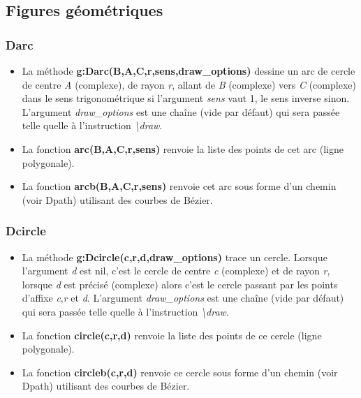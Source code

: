 \documentclass[%
10pt,%
a4paper,%
french,%
]%
{article}%
\begin{document}
\subsection{Figures géométriques}

\subsubsection{Darc}
\begin{itemize}
    \item La méthode \textbf{g:Darc(B,A,C,r,sens,draw\_options)} dessine un arc de cercle de centre \emph{A} (complexe), de rayon \emph{r}, allant de \emph{B} (complexe) vers \emph{C} (complexe) dans le sens trigonométrique si l'argument \emph{sens} vaut 1, le sens inverse sinon. L'argument \emph{draw\_options} est une chaîne (vide par défaut) qui sera passée telle quelle à l'instruction \emph{\textbackslash draw}.
    \item La fonction \textbf{arc(B,A,C,r,sens)} renvoie la liste des points de cet arc (ligne polygonale). 
    \item La fonction \textbf{arcb(B,A,C,r,sens)} renvoie cet arc sous forme d'un chemin (voir Dpath) utilisant des courbes de Bézier.
\end{itemize}

\subsubsection{Dcircle}
\begin{itemize}
    \item La méthode \textbf{g:Dcircle(c,r,d,draw\_options)} trace un cercle. Lorsque l'argument \emph{d} est nil, c'est le cercle de centre \emph{c} (complexe) et de rayon \emph{r}, lorsque \emph{d} est précisé (complexe) alors c'est le cercle passant par les points d'affixe \emph{c},\emph{r} et \emph{d}. L'argument \emph{draw\_options} est une chaîne (vide par défaut) qui sera passée telle quelle à l'instruction \emph{\textbackslash draw}.
  \item La fonction \textbf{circle(c,r,d)} renvoie la liste des points de ce cercle (ligne polygonale). 
  \item La fonction \textbf{circleb(c,r,d)} renvoie ce cercle sous forme d'un chemin (voir Dpath) utilisant des courbes de Bézier.
\end{itemize}
\end{document}
